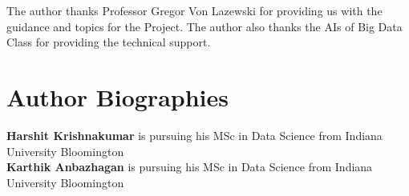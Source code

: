 \documentclass[9pt,twocolumn,twoside]{../../styles/osajnl}
\begin{document}
The author thanks Professor Gregor Von Lazewski for providing us with the guidance and topics for the Project. The author also thanks the AIs of Big Data Class for providing the technical
support.




 
\section*{Author Biographies}
\begingroup
\setlength\intextsep{0pt}
\begin{minipage}[t][3.2cm][t]{1.0\columnwidth} %
{\bfseries Harshit Krishnakumar} is pursuing his MSc in Data Science from
Indiana University Bloomington\\
{\bfseries Karthik Anbazhagan} is pursuing his MSc in Data Science from
Indiana University Bloomington
\end{minipage}
\endgroup
\end{document}
